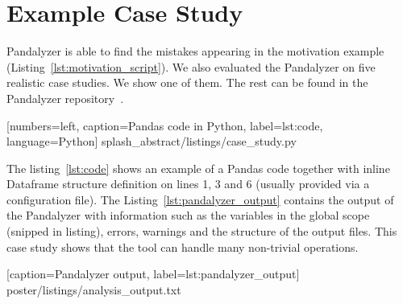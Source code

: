 \section{Example Case Study}

Pandalyzer is able to find the mistakes appearing in the motivation example (Listing~\ref{lst:motivation_script}).
We also evaluated the Pandalyzer on five realistic case studies.
We show one of them.
The rest can be found in the Pandalyzer repository~\cite{pandalyzer}.





[numbers=left, caption=Pandas code in Python, label={lst:code}, language=Python]
{splash_abstract/listings/case_study.py}

The listing~\ref{lst:code} shows an example of a Pandas code together with inline Dataframe structure definition
on lines 1, 3 and 6 (usually provided via a configuration file).
The Listing~\ref{lst:pandalyzer_output} contains the output of the Pandalyzer with information such as the variables
in the global scope (snipped in listing), errors, warnings and the structure of the output files.
This case study shows that the tool can handle many non-trivial operations.


[caption=Pandalyzer output, label={lst:pandalyzer_output}]
{poster/listings/analysis_output.txt}
